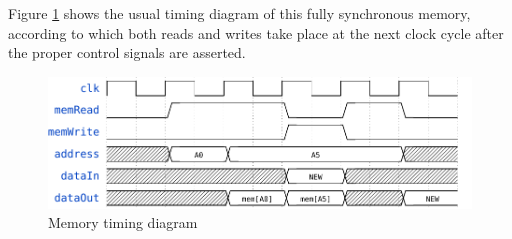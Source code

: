 \documentclass[a4paper]{article}
\begin{document}
Figure \ref{fig:memory_timing} shows the usual timing diagram of this fully synchronous memory, according to which both reads and writes take place at the next clock cycle after the proper control signals are asserted.

\begin{figure}[hbtp]
    \centering
    \includegraphics[scale=.8]{../memory/ref/timing/memory_timing.pdf}
    \caption{Memory timing diagram}
    \label{fig:memory_timing}
\end{figure}
\end{document}
